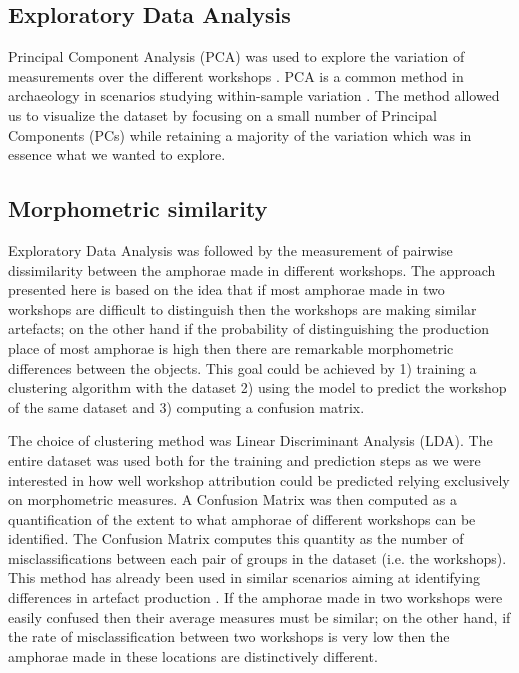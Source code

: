 \documentclass[review]{elsarticle}
\begin{document}
\subsection{Exploratory Data Analysis}

Principal Component Analysis (PCA) was used to explore the variation of measurements over the different workshops \citep{jolliffe_principal_2002}. PCA is a common method in archaeology in scenarios studying within-sample variation \citep{shennan_quantifying_1997, li_crossbows_2014, schillinger_differences_2016}. The method allowed us to visualize the dataset by focusing on a small number of Principal Components (PCs) while retaining a majority of the variation which was in essence what we wanted to explore. 

\subsection{Morphometric similarity} 

Exploratory Data Analysis was followed by the measurement of pairwise dissimilarity between the amphorae made in different workshops. The approach presented here is based on the idea that if most amphorae made in two workshops are difficult to distinguish then the workshops are making similar artefacts; on the other hand if the probability of distinguishing the production place of most amphorae is high then there are remarkable morphometric differences between the objects. This goal could be achieved by 1) training a clustering algorithm with the dataset 2) using the model to predict the workshop of the same dataset and 3) computing a confusion matrix.

The choice of clustering method was Linear Discriminant Analysis (LDA). The entire dataset was used both for the training and prediction steps as we were interested in how well workshop attribution could be predicted relying exclusively on morphometric measures. A Confusion Matrix was then computed as a quantification of the extent to what amphorae of different workshops can be identified. The Confusion Matrix computes this quantity as the number of misclassifications between each pair of groups in the dataset (i.e. the workshops). This method has already been used in similar scenarios aiming at identifying differences in artefact production \citep{thorpe_distribution_1984,i_martin_alisis_1998,charlton_investigating_2012}. If the amphorae made in two workshops were easily confused then their average measures must be similar; on the other hand, if the rate of misclassification between two workshops is very low then the amphorae made in these locations are distinctively different.
\end{document}
